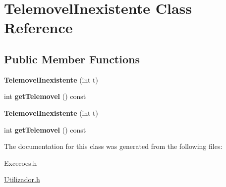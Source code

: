\hypertarget{class_telemovel_inexistente}{}\section{Telemovel\+Inexistente Class Reference}
\label{class_telemovel_inexistente}
\subsection*{Public Member Functions}
\begin{DoxyCompactItemize}
\item 
\hypertarget{class_telemovel_inexistente_a76a7d797f543553b9ba31e9d1e127ffa}{}{\bfseries Telemovel\+Inexistente} (int t)\label{class_telemovel_inexistente_a76a7d797f543553b9ba31e9d1e127ffa}

\item 
\hypertarget{class_telemovel_inexistente_a8299cb739b4c8dc8537f2ea465deeaf8}{}int {\bfseries get\+Telemovel} () const \label{class_telemovel_inexistente_a8299cb739b4c8dc8537f2ea465deeaf8}

\item 
\hypertarget{class_telemovel_inexistente_a76a7d797f543553b9ba31e9d1e127ffa}{}{\bfseries Telemovel\+Inexistente} (int t)\label{class_telemovel_inexistente_a76a7d797f543553b9ba31e9d1e127ffa}

\item 
\hypertarget{class_telemovel_inexistente_a8299cb739b4c8dc8537f2ea465deeaf8}{}int {\bfseries get\+Telemovel} () const \label{class_telemovel_inexistente_a8299cb739b4c8dc8537f2ea465deeaf8}

\end{DoxyCompactItemize}


The documentation for this class was generated from the following files\+:\begin{DoxyCompactItemize}
\item 
Excecoes.\+h\item 
\hyperlink{_utilizador_8h}{Utilizador.\+h}\end{DoxyCompactItemize}
